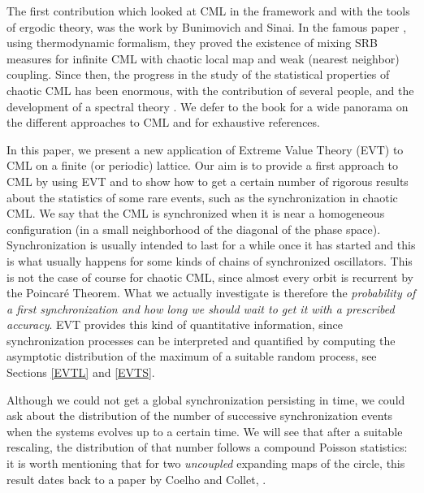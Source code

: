\documentclass[12pt,reqno,a4paper]{amsart}
\begin{document}


%



The first contribution which looked at CML in the framework and with the tools of ergodic theory,
was the work by Bunimovich and Sinai. In the famous paper \cite{BS}, using thermodynamic formalism, they proved the existence of mixing SRB measures for infinite CML with chaotic local map and weak (nearest
neighbor) coupling.  Since then, the progress in the study of the  statistical properties of chaotic CML has been enormous, with the contribution of several people, and the development
 of a spectral theory \cite{KELI, KELIV}. We defer to the book \cite{FC} for a wide panorama on the different approaches to CML and for exhaustive references.



In this paper, we present a new application of Extreme Value Theory (EVT) to CML on a finite (or periodic) lattice. Our aim  is to provide a first approach to CML by using EVT and to show how to get a certain number of rigorous results about the statistics of some rare events, such as the synchronization in chaotic CML. We say that the CML is synchronized when it is near a homogeneous configuration (in a small neighborhood of the diagonal of the phase space).   Synchronization is usually intended to last for a while once it has started and this is what usually happens for some kinds of  chains of synchronized oscillators. This is not the case  of course for chaotic CML, since almost every orbit is recurrent by the Poincar\'e Theorem. What we actually investigate is therefore  the {\em probability of a first synchronization and how long we should wait to get it with a prescribed accuracy}. EVT provides this kind of quantitative information, since  synchronization processes can be interpreted and quantified by computing the asymptotic distribution of the maximum of a suitable random process, see Sections \ref{EVTL} and \ref{EVTS}.



Although we could not get a global synchronization persisting in time, we could ask about the distribution of the number of successive synchronization events when the systems evolves up to a certain time. We will see that after a suitable rescaling, the distribution of that number follows a compound Poisson statistics: it is worth mentioning that for two {\em uncoupled} expanding maps of the circle, this result dates back to a paper by Coelho and Collet, \cite{CC}. \\
\end{document}
